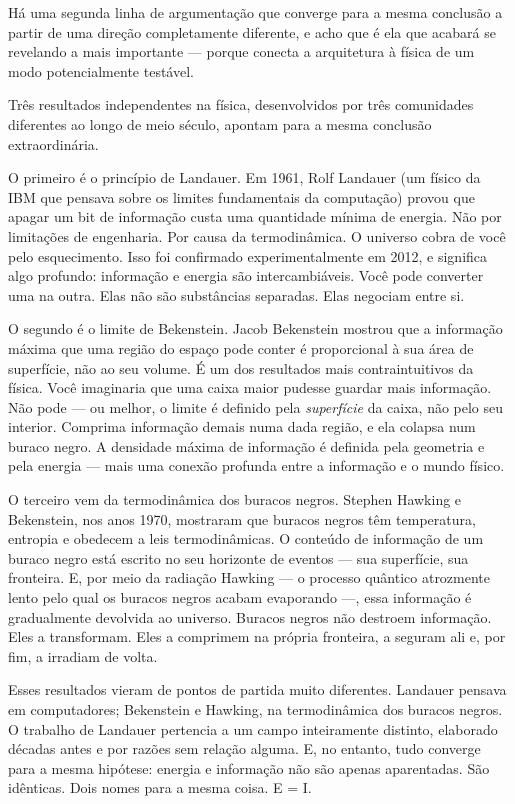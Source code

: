 \documentclass[11pt, twoside, openright]{book}
\begin{document}
Há uma segunda linha de argumentação que converge para a mesma conclusão a partir de uma direção completamente diferente, e acho que é ela que acabará se revelando a mais importante --- porque conecta a arquitetura à física de um modo potencialmente testável.

Três resultados independentes na física, desenvolvidos por três comunidades diferentes ao longo de meio século, apontam para a mesma conclusão extraordinária.

O primeiro é o princípio de Landauer. Em 1961, Rolf Landauer (um físico da IBM que pensava sobre os limites fundamentais da computação) provou que apagar um bit de informação custa uma quantidade mínima de energia. Não por limitações de engenharia. Por causa da termodinâmica. O universo cobra de você pelo esquecimento. Isso foi confirmado experimentalmente em 2012, e significa algo profundo: informação e energia são intercambiáveis. Você pode converter uma na outra. Elas não são substâncias separadas. Elas negociam entre si.

O segundo é o limite de Bekenstein. Jacob Bekenstein mostrou que a informação máxima que uma região do espaço pode conter é proporcional à sua área de superfície, não ao seu volume. É um dos resultados mais contraintuitivos da física. Você imaginaria que uma caixa maior pudesse guardar mais informação. Não pode --- ou melhor, o limite é definido pela \textit{superfície} da caixa, não pelo seu interior. Comprima informação demais numa dada região, e ela colapsa num buraco negro. A densidade máxima de informação é definida pela geometria e pela energia --- mais uma conexão profunda entre a informação e o mundo físico.

O terceiro vem da termodinâmica dos buracos negros. Stephen Hawking e Bekenstein, nos anos 1970, mostraram que buracos negros têm temperatura, entropia e obedecem a leis termodinâmicas. O conteúdo de informação de um buraco negro está escrito no seu horizonte de eventos --- sua superfície, sua fronteira. E, por meio da radiação Hawking --- o processo quântico atrozmente lento pelo qual os buracos negros acabam evaporando ---, essa informação é gradualmente devolvida ao universo. Buracos negros não destroem informação. Eles a transformam. Eles a comprimem na própria fronteira, a seguram ali e, por fim, a irradiam de volta.

Esses resultados vieram de pontos de partida muito diferentes. Landauer pensava em computadores; Bekenstein e Hawking, na termodinâmica dos buracos negros. O trabalho de Landauer pertencia a um campo inteiramente distinto, elaborado décadas antes e por razões sem relação alguma. E, no entanto, tudo converge para a mesma hipótese: energia e informação não são apenas aparentadas. São idênticas. Dois nomes para a mesma coisa. E = I.
\end{document}
